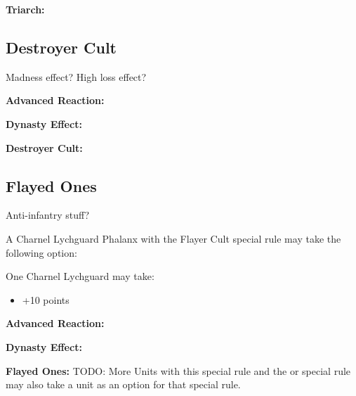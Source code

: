 \begin{multicols}{2}
\textbf{Triarch:}


\newpage
\subsection{Destroyer Cult}

Madness effect? High loss effect?

\textbf{Advanced Reaction:}

\textbf{Dynasty Effect:}

\textbf{Destroyer Cult:}


\newpage
\subsection{Flayed Ones}

Anti-infantry stuff?

A Charnel Lychguard Phalanx with the Flayer Cult special rule may take the following option:

One Charnel Lychguard may take:
\begin{itemize}
	\item {} \dotfill +10 points
\end{itemize} 

\textbf{Advanced Reaction:}

\textbf{Dynasty Effect:}

\textbf{Flayed Ones:} TODO: More Units with this special rule and the  or  special rule may also take a  unit as an option for that special rule.


\end{multicols}
